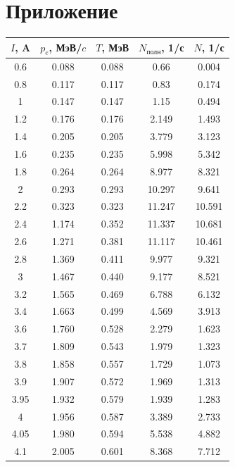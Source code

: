 \documentclass[a4paper,12pt]{article} %
\begin{document}
\section{Приложение}
\begin{table}[h]
    \centering
    \begin{tabular}{|c|c|c|c|c|} \hline
        $I$, A & $p_e$, МэВ/$c$ & $T$, МэВ & $N_\text{полн}$, 1/с & $N$, 1/с \\ \hline
        0.6 & 0.088 & 0.088 & 0.66 & 0.004 \\ \hline
        0.8 & 0.117 & 0.117 & 0.83 & 0.174 \\ \hline
        1 & 0.147 & 0.147 & 1.15 & 0.494 \\ \hline
        1.2 & 0.176 & 0.176 & 2.149 & 1.493 \\ \hline
        1.4 & 0.205 & 0.205 & 3.779 & 3.123 \\ \hline
        1.6 & 0.235 & 0.235 & 5.998 & 5.342 \\ \hline
        1.8 & 0.264 & 0.264 & 8.977 & 8.321 \\ \hline
        2 & 0.293 & 0.293 & 10.297 & 9.641 \\ \hline
        2.2 & 0.323 & 0.323 & 11.247 & 10.591 \\ \hline
        2.4 & 1.174 & 0.352 & 11.337 & 10.681 \\ \hline
        2.6 & 1.271 & 0.381 & 11.117 & 10.461 \\ \hline
        2.8 & 1.369 & 0.411 & 9.977 & 9.321 \\ \hline
        3 & 1.467 & 0.440 & 9.177 & 8.521 \\ \hline
        3.2 & 1.565 & 0.469 & 6.788 & 6.132 \\ \hline
        3.4 & 1.663 & 0.499 & 4.569 & 3.913 \\ \hline
        3.6 & 1.760 & 0.528 & 2.279 & 1.623 \\ \hline
        3.7 & 1.809 & 0.543 & 1.979 & 1.323 \\ \hline
        3.8 & 1.858 & 0.557 & 1.729 & 1.073 \\ \hline
        3.9 & 1.907 & 0.572 & 1.969 & 1.313 \\ \hline
        3.95 & 1.932 & 0.579 & 1.939 & 1.283 \\ \hline
        4 & 1.956 & 0.587 & 3.389 & 2.733 \\ \hline
        4.05 & 1.980 & 0.594 & 5.538 & 4.882 \\ \hline
        4.1 & 2.005 & 0.601 & 8.368 & 7.712 \\ \hline

\end{tabular}
\end{table}
\end{document}
